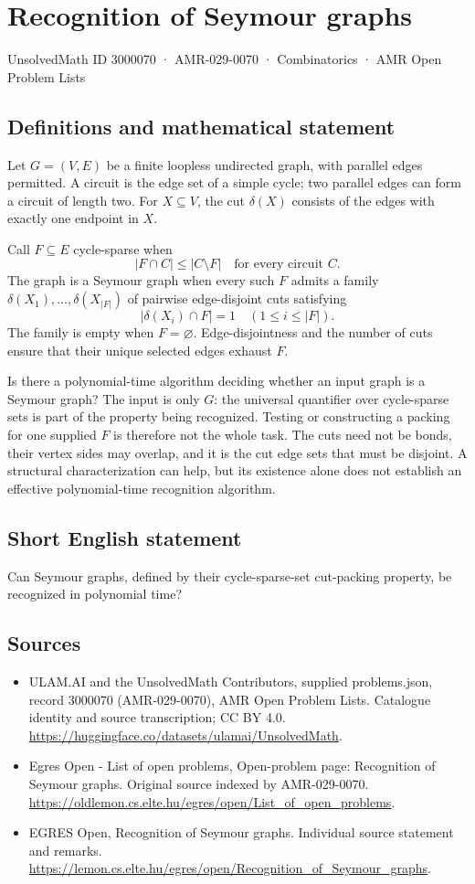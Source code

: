 \documentclass[11pt,a4paper]{article}
\begin{document}
\section*{Recognition of Seymour graphs}\label{3000070}
{\small UnsolvedMath ID 3000070 · AMR-029-0070 · Combinatorics · AMR Open Problem Lists}
\subsection{Definitions and mathematical statement}
Let $G=(V,E)$ be a finite loopless undirected graph, with parallel
edges permitted. A circuit is the edge set of a simple cycle;
two parallel edges can form a circuit of length two.
For $X\subseteq V$, the cut $\delta(X)$ consists of the edges
with exactly one endpoint in $X$.

Call $F\subseteq E$ cycle-sparse when
\[
                   |F\cap C|\le|C\setminus F|
                         \quad\text{for every circuit }C.
\]
The graph is a Seymour graph when every such $F$ admits a family
$\delta(X_1),\ldots,\delta(X_{|F|})$ of pairwise edge-disjoint cuts
satisfying
\[
                       |\delta(X_i)\cap F|=1
                                      \quad(1\le i\le|F|).
\]
The family is empty when $F=\varnothing$. Edge-disjointness and the
number of cuts ensure that their unique selected edges exhaust $F$.

Is there a polynomial-time algorithm deciding whether an input graph
is a Seymour graph? The input is only $G$: the universal quantifier
over cycle-sparse sets is part of the property being recognized.
Testing or constructing a packing for one supplied $F$ is therefore
not the whole task. The cuts need not be bonds, their vertex sides
may overlap, and it is the cut edge sets that must be disjoint.
A structural characterization can help, but its existence alone does
not establish an effective polynomial-time recognition algorithm.
\subsection{Short English statement}
Can Seymour graphs, defined by their cycle-sparse-set cut-packing property, be recognized in polynomial time?
\subsection{Sources}
\begin{itemize}
\item[S1] ULAM.AI and the UnsolvedMath Contributors, supplied problems.json, record 3000070 (AMR-029-0070), AMR Open Problem Lists. Catalogue identity and source transcription; CC BY 4.0.
\url{https://huggingface.co/datasets/ulamai/UnsolvedMath}.
\item[S2] Egres Open - List of open problems, Open-problem page: Recognition of Seymour graphs. Original source indexed by AMR-029-0070.
\url{https://oldlemon.cs.elte.hu/egres/open/List_of_open_problems}.
\item[S3] EGRES Open, Recognition of Seymour graphs. Individual source statement and remarks.
\url{https://lemon.cs.elte.hu/egres/open/Recognition_of_Seymour_graphs}.
\end{itemize}
\end{document}
